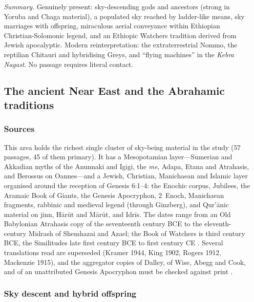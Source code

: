 \documentclass[11pt,a4paper]{article}
\begin{document}
\emph{Summary.} Genuinely present: sky-descending gods and ancestors (strong in Yoruba and Chaga material), a populated sky reached by ladder-like means, sky marriages with offspring, miraculous aerial conveyance within Ethiopian Christian-Solomonic legend, and an Ethiopic Watchers tradition derived from Jewish apocalyptic. Modern reinterpretation: the extraterrestrial Nommo, the reptilian Chitauri and hybridising Greys, and ``flying machines'' in the \emph{Kebra Nagast}. No passage requires literal contact.

\subsection{The ancient Near East and the Abrahamic traditions}\label{sec:neareast}

\subsubsection{Sources}

This area holds the richest single cluster of sky-being material in the study (57 passages, 45 of them primary). It has a Mesopotamian layer---Sumerian and Akkadian myths of the Anunnaki and Igigi, the \emph{me}, Adapa, Etana and Atrahasis, and Berossus on Oannes---and a Jewish, Christian, Manichaean and Islamic layer organised around the reception of Genesis 6:1--4: the Enochic corpus, Jubilees, the Aramaic Book of Giants, the Genesis Apocryphon, 2~Enoch, Manichaean fragments, rabbinic and medieval legend (through Ginzberg), and Qur'ānic material on jinn, Hārūt and Mārūt, and Idrīs. The dates range from an Old Babylonian Atrahasis copy of the seventeenth century BCE to the eleventh-century Midrash of Shemhazai and Azael; the Book of Watchers is third century BCE, the Similitudes late first century BCE to first century CE \parencite{charles1917enoch,nickelsburg2001enoch,drawnel2011astronomical}. Several translations read are superseded (Kramer 1944, King 1902, Rogers 1912, Mackenzie 1915), and the aggregator copies of Dalley, of Wise, Abegg and Cook, and of an unattributed Genesis Apocryphon must be checked against print \parencite{dalley1989myths,wise1996dss,vermes2004complete}.

\subsubsection{Sky descent and hybrid offspring}
\end{document}
